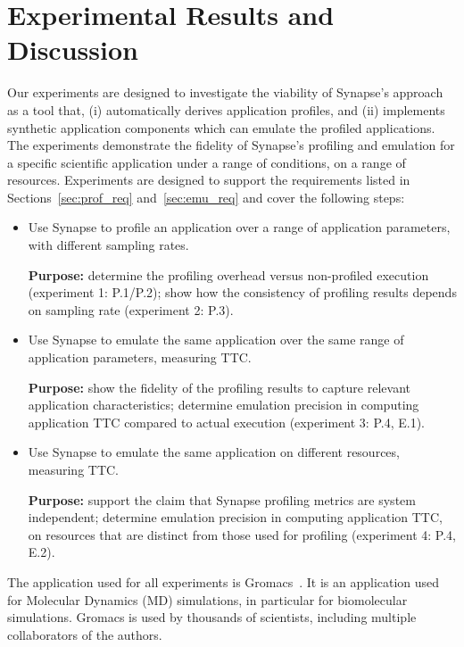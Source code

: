 \documentclass[10pt, conference, compsocconf]{IEEEtran}
\newcommand{\B}[1]{\textbf{#1}\xspace}
\newcommand{\synapse}{Synapse\xspace}
\begin{document}
\section{Experimental Results and Discussion} 
\label{sec:exp}

Our experiments are designed to investigate the viability of \synapse's approach
as a tool that, (i) automatically derives application profiles, and (ii)
implements synthetic application components which can emulate the profiled
applications.  The experiments demonstrate the fidelity of \synapse's profiling
and emulation for a specific scientific application under a range of conditions,
on a range of resources. Experiments are designed to support the requirements
listed in Sections~\ref{sec:prof_req} and~\ref{sec:emu_req} and cover the
following steps:





 \begin{itemize}
  
  \item Use \synapse to profile an application over a range of
      application parameters, with different sampling rates.

      \B{Purpose:} determine the profiling overhead versus
      non-profiled execution (experiment 1: P.1/P.2); show how the
      consistency of profiling results depends on sampling rate
      (experiment 2: P.3).

  \item Use \synapse to emulate the same application over the same
      range of application parameters, measuring TTC.

      \B{Purpose:} show the fidelity of the profiling results to capture
      relevant application characteristics; determine emulation precision in
      computing application TTC compared to actual execution (experiment 3: P.4,
      E.1).

  \item Use \synapse to emulate the same application on different
      resources, measuring TTC.
      
      \B{Purpose:} support the claim that \synapse profiling metrics are system
      independent; determine emulation precision in computing application TTC,
      on resources that are distinct from those used for profiling (experiment 4: P.4, E.2).

 \end{itemize}

 The application used for all experiments is Gromacs~\cite{pronk2013gromacs}. It
 is an application used for Molecular Dynamics (MD) simulations, in particular
 for biomolecular simulations. Gromacs is used by
 thousands of scientists, including multiple collaborators of the
 authors. 
\end{document}

